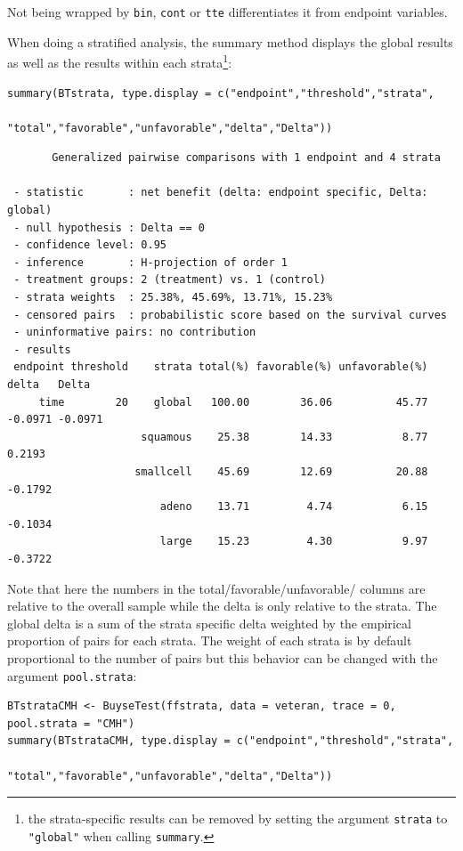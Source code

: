 \documentclass[12pt]{article}
\begin{document}
Not being wrapped by \texttt{bin}, \texttt{cont} or \texttt{tte} differentiates it from
endpoint variables.

\bigskip

When doing a stratified analysis, the summary method displays the
global results as well as the results within each strata\footnote{the
strata-specific results can be removed by setting the argument
\texttt{strata} to \texttt{"global"} when calling \texttt{summary}.}:
\lstset{language=r,label= ,caption= ,captionpos=b,numbers=none}
\begin{lstlisting}
summary(BTstrata, type.display = c("endpoint","threshold","strata",
                              "total","favorable","unfavorable","delta","Delta"))
\end{lstlisting}

\begin{verbatim}
       Generalized pairwise comparisons with 1 endpoint and 4 strata

 - statistic       : net benefit (delta: endpoint specific, Delta: global) 
 - null hypothesis : Delta == 0 
 - confidence level: 0.95 
 - inference       : H-projection of order 1
 - treatment groups: 2 (treatment) vs. 1 (control) 
 - strata weights  : 25.38%, 45.69%, 13.71%, 15.23% 
 - censored pairs  : probabilistic score based on the survival curves
 - uninformative pairs: no contribution
 - results
 endpoint threshold    strata total(%) favorable(%) unfavorable(%)   delta   Delta
     time        20    global   100.00        36.06          45.77 -0.0971 -0.0971
                     squamous    25.38        14.33           8.77  0.2193        
                    smallcell    45.69        12.69          20.88 -0.1792        
                        adeno    13.71         4.74           6.15 -0.1034        
                        large    15.23         4.30           9.97 -0.3722
\end{verbatim}

Note that here the numbers in the total/favorable/unfavorable/ columns
are relative to the overall sample while the delta is only relative to
the strata. The global delta is a sum of the strata specific delta
weighted by the empirical proportion of pairs for each strata. The
weight of each strata is by default proportional to the number of
pairs but this behavior can be changed with the argument \texttt{pool.strata}:

\lstset{language=r,label= ,caption= ,captionpos=b,numbers=none}
\begin{lstlisting}
BTstrataCMH <- BuyseTest(ffstrata, data = veteran, trace = 0, pool.strata = "CMH")
summary(BTstrataCMH, type.display = c("endpoint","threshold","strata",
                                      "total","favorable","unfavorable","delta","Delta"))
\end{lstlisting}
\end{document}
